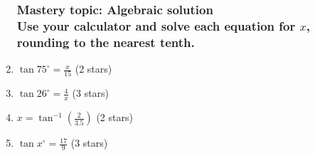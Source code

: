 \documentclass[12pt, twoside]{article}
\begin{document}
\begin{enumerate}
\subsubsection*{Mastery topic: Algebraic solution\\[0.5cm]
Use your calculator and solve each equation for $x$, rounding to the nearest tenth.}
\item $\displaystyle \tan 75^\circ = \frac{x}{15}$ \hfill (2 stars) \vspace{3cm}
\item $\displaystyle \tan 26^\circ = \frac{4}{x}$ \hfill (3 stars) \vspace{4cm}
\item $\displaystyle x = \tan^{-1} (\frac{2}{3.5})$ \hfill (2 stars) \vspace{3cm}
\item $\displaystyle \tan x^\circ = \frac{17}{9}$ \hfill (3 stars) \vspace{3cm}


\end{enumerate}
\end{document}
